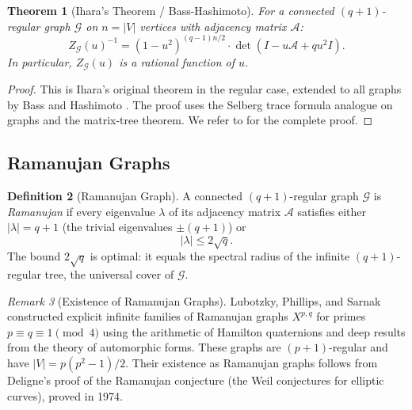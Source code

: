 \documentclass[12pt, a4paper]{article}
\theoremstyle{plain}
\newtheorem{theorem}{Theorem}[section]
\theoremstyle{definition}
\newtheorem{definition}[theorem]{Definition}
\theoremstyle{remark}
\newtheorem{remark}[theorem]{Remark}
\newcommand{\abs}[1]{\left| #1 \right|}
\newcommand{\calG}{\mathcal{G}}
\newcommand{\calA}{\mathcal{A}}
\begin{document}
\begin{theorem}[Ihara's Theorem / Bass-Hashimoto]\label{thm:ihara_formula}
  For a connected $(q+1)$-regular graph $\calG$ on $n = |V|$ vertices
  with adjacency matrix $\calA$:
  \begin{equation}\label{eq:ihara_formula}
    Z_\calG(u)^{-1} = (1 - u^2)^{(q-1)n/2} \cdot
    \det\!\left(I - u\calA + qu^2 I\right).
  \end{equation}
  In particular, $Z_\calG(u)$ is a rational function of $u$.
\end{theorem}

\begin{proof}
  This is Ihara's original theorem \citep{Ihara1966} in the regular case,
  extended to all graphs by Bass and Hashimoto \citep{HaShieh2013}. The
  proof uses the Selberg trace formula analogue on graphs and the matrix-tree
  theorem. We refer to \citet{Terras1999} for the complete proof.
\end{proof}

\subsection{Ramanujan Graphs}

\begin{definition}[Ramanujan Graph]\label{def:ramanujan}
  A connected $(q+1)$-regular graph $\calG$ is \emph{Ramanujan} if every
  eigenvalue $\lambda$ of its adjacency matrix $\calA$ satisfies either
  $\abs{\lambda} = q+1$ (the trivial eigenvalues $\pm(q+1)$) or
  \begin{equation}\label{eq:ramanujan_bound}
    \abs{\lambda} \leq 2\sqrt{q}.
  \end{equation}
  The bound $2\sqrt{q}$ is optimal: it equals the spectral radius of the
  infinite $(q+1)$-regular tree, the universal cover of $\calG$.
\end{definition}

\begin{remark}[Existence of Ramanujan Graphs]
  Lubotzky, Phillips, and Sarnak \citep{Selberg1956} constructed explicit
  infinite families of Ramanujan graphs $X^{p,q}$ for primes $p \equiv
  q \equiv 1 \pmod{4}$ using the arithmetic of Hamilton quaternions and deep
  results from the theory of automorphic forms. These graphs are $(p+1)$-regular
  and have $|V| = p(p^2-1)/2$. Their existence as Ramanujan graphs follows from
  Deligne's proof of the Ramanujan conjecture (the Weil conjectures for elliptic
  curves), proved in 1974.
\end{remark}
\end{document}
